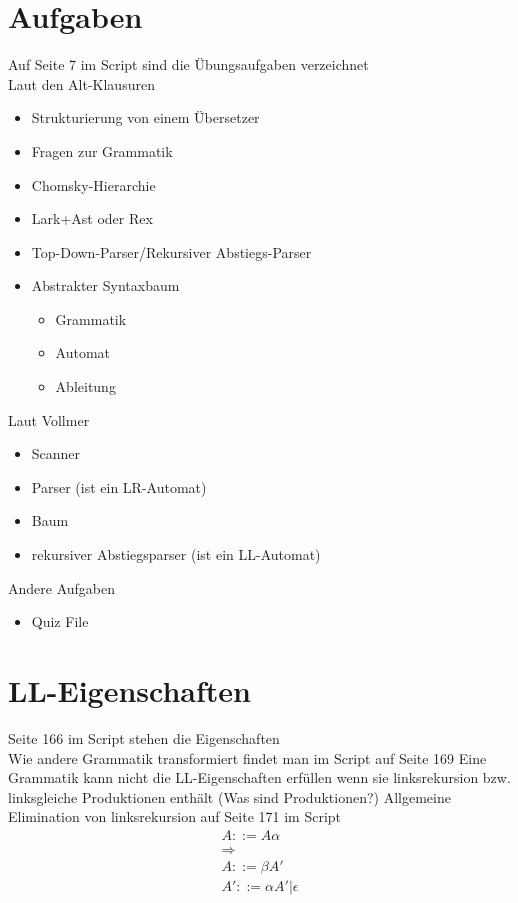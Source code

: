 \documentclass[
  ngerman
  ,12pt
  ,pdftex
]{article}
\begin{document}
\section{Aufgaben}
Auf Seite 7 im Script sind die Übungsaufgaben verzeichnet\\
Laut den Alt-Klausuren
\begin{itemize}
  \item Strukturierung von einem Übersetzer
  \item Fragen zur Grammatik
  \item Chomsky-Hierarchie
  \item Lark+Ast oder Rex
  \item Top-Down-Parser/Rekursiver Abstiegs-Parser
  \item Abstrakter Syntaxbaum
  \begin{itemize}
    \item Grammatik 
    \item Automat
    \item Ableitung
  \end{itemize}
\end{itemize}
Laut Vollmer
\begin{itemize}
  \item Scanner
  \item Parser (ist ein LR-Automat)
  \item Baum
  \item rekursiver Abstiegsparser (ist ein LL-Automat)
\end{itemize}
Andere Aufgaben
\begin{itemize}
  \item Quiz File
\end{itemize}


\section{LL-Eigenschaften}
Seite 166 im Script stehen die Eigenschaften \\
Wie andere Grammatik transformiert findet man im Script auf Seite 169
Eine Grammatik kann nicht die LL-Eigenschaften erfüllen wenn sie linksrekursion bzw. linksgleiche Produktionen enthält (Was sind Produktionen?)
Allgemeine Elimination von linksrekursion auf Seite 171 im Script
\begin{align*}
    A::= A \alpha \\
    \Longrightarrow \\
    A::= \beta A' \\
    A'::=\alpha A' | \epsilon
\end{align*}
\end{document}
